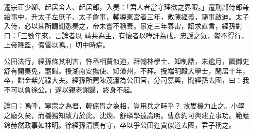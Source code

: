 \begin{pinyinscope}
 遷宗正少卿、起居舍人、起居郎，入奏：「君人者當守理欲之界限。」遷刑部侍郎兼給事中，升太子左庶子、太子詹事，輔導東宮者三年，敷陳經義，隨事啟迪。太子入侍，必以其所講聞悉奏之，帝未嘗不稱善。景定三年春雷，詔求直言，經孫對曰：「三數年來，言論者以
 靖共為主，有懷者以嘩訐為戒，忠讜之氣，鬱不得行，上帝降監，假雷以鳴。」切中時病。



 公田法行，經孫條其利害，忤丞相賈似道，拜翰林學士、知制誥，未逾月，諷御史舒有開奏免，罷歸。授湖南安撫使、知潭州，不拜。授端明殿大學士，閑居十年，卒，贈金紫光祿大夫。經孫所薦陳茂濂為公田官，分司嘉興，聞經孫去國，曰：我不可以負徐公。」遂以親老謝歸，終身不起。



 論曰：嗚呼，寧宗之為君，韓侂胄之為相，豈用兵之時乎？
 故婁機力止之。小學之廢久矣，而機獨知致力於此。沈煥、舒璘學遠識明。曹彥約可與建立事功。範應鈴赫然政事如神明。徐經孫清慎有守，卒以爭公田迕賈似道去國，君子稱之。



\end{pinyinscope}